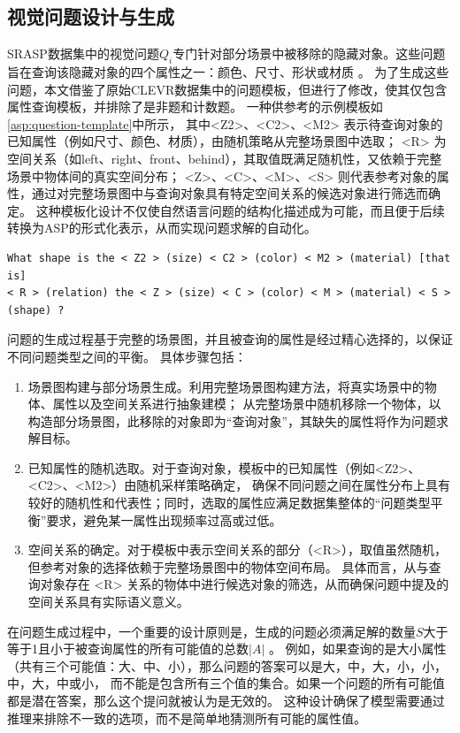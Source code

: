 \subsection{视觉问题设计与生成}
SRASP数据集中的视觉问题$Q_i$专门针对部分场景中被移除的隐藏对象。这些问题旨在查询该隐藏对象的四个属性之一：颜色、尺寸、形状或材质 。
为了生成这些问题，本文借鉴了原始CLEVR数据集中的问题模板，但进行了修改，使其仅包含属性查询模板，并排除了是非题和计数题。
一种供参考的示例模板如\ref{asp:question-template}中所示，
其中<Z2>、<C2>、<M2> 表示待查询对象的已知属性（例如尺寸、颜色、材质），由随机策略从完整场景图中选取；
<R> 为空间关系（如left、right、front、behind），其取值既满足随机性，又依赖于完整场景中物体间的真实空间分布；
<Z>、<C>、<M>、<S> 则代表参考对象的属性，通过对完整场景图中与查询对象具有特定空间关系的候选对象进行筛选而确定。
这种模板化设计不仅使自然语言问题的结构化描述成为可能，而且便于后续转换为ASP的形式化表示，从而实现问题求解的自动化。

\begin{lstlisting}[label=asp:question-template]
What shape is the < Z2 > (size) < C2 > (color) < M2 > (material) [that is] 
< R > (relation) the < Z > (size) < C > (color) < M > (material) < S > (shape) ?
\end{lstlisting}

问题的生成过程基于完整的场景图，并且被查询的属性是经过精心选择的，以保证不同问题类型之间的平衡。
具体步骤包括：
\begin{enumerate}[itemsep=0pt,parsep=0pt]
\item 场景图构建与部分场景生成。利用完整场景图构建方法，将真实场景中的物体、属性以及空间关系进行抽象建模；
从完整场景中随机移除一个物体，以构造部分场景图，此移除的对象即为“查询对象”，其缺失的属性将作为问题求解目标。
\item 已知属性的随机选取。对于查询对象，模板中的已知属性（例如<Z2>、<C2>、<M2>）由随机采样策略确定，
确保不同问题之间在属性分布上具有较好的随机性和代表性；同时，选取的属性应满足数据集整体的“问题类型平衡”要求，避免某一属性出现频率过高或过低。
\item 空间关系的确定。对于模板中表示空间关系的部分（<R>），取值虽然随机，但参考对象的选择依赖于完整场景图中的物体空间布局。
具体而言，从与查询对象存在 <R> 关系的物体中进行候选对象的筛选，从而确保问题中提及的空间关系具有实际语义意义。
\end{enumerate}

在问题生成过程中，一个重要的设计原则是，生成的问题必须满足解的数量$S$大于等于1且小于被查询属性的所有可能值的总数$|A|$ 。
例如，如果查询的是大小属性（共有三个可能值：大、中、小），那么问题的答案可以是{大，中}，{大，小}，{小，中}，{大}，{中}或{小}，
而不能是包含所有三个值的集合。如果一个问题的所有可能值都是潜在答案，那么这个提问就被认为是无效的。
这种设计确保了模型需要通过推理来排除不一致的选项，而不是简单地猜测所有可能的属性值。

